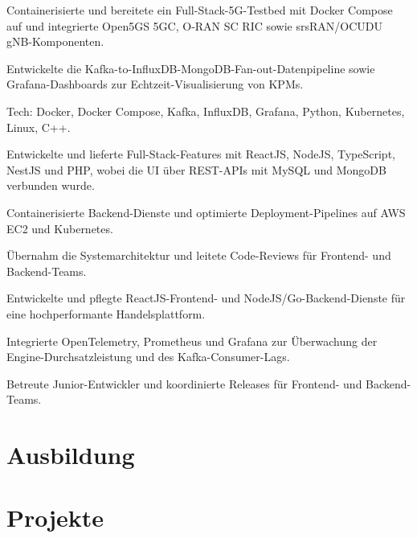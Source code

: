 \documentclass[10pt,a4paper]{resume}
\begin{document}
\bullets
  \item Containerisierte und bereitete ein Full-Stack-5G-Testbed mit Docker Compose auf und integrierte Open5GS 5GC, O-RAN SC RIC sowie srsRAN/OCUDU gNB-Komponenten.
  \item Entwickelte die Kafka-to-InfluxDB-MongoDB-Fan-out-Datenpipeline sowie Grafana-Dashboards zur Echtzeit-Visualisierung von KPMs.
  \item Tech: Docker, Docker Compose, Kafka, InfluxDB, Grafana, Python, Kubernetes, Linux, C++.
\bulletsend
\vspace{1.5pt}
\bullets
  \item Entwickelte und lieferte Full-Stack-Features mit ReactJS, NodeJS, TypeScript, NestJS und PHP, wobei die UI über REST-APIs mit MySQL und MongoDB verbunden wurde.
  \item Containerisierte Backend-Dienste und optimierte Deployment-Pipelines auf AWS EC2 und Kubernetes.
  \item Übernahm die Systemarchitektur und leitete Code-Reviews für Frontend- und Backend-Teams.
\bulletsend
\vspace{1.5pt}
\bullets
  \item Entwickelte und pflegte ReactJS-Frontend- und NodeJS/Go-Backend-Dienste für eine hochperformante Handelsplattform.
  \item Integrierte OpenTelemetry, Prometheus und Grafana zur Überwachung der Engine-Durchsatzleistung und des Kafka-Consumer-Lags.
  \item Betreute Junior-Entwickler und koordinierte Releases für Frontend- und Backend-Teams.
\bulletsend
\vspace{1.5pt}

\section{Ausbildung}

\vspace{2pt}

\section{Projekte}
\end{document}

